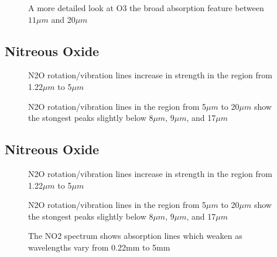 \documentclass[12pt]{article}
\begin{document}
\vspace*{11.5cm}
\begin{figure}[htb]
\caption{A more detailed look at O3 the broad absorption feature between $11 \mu m$ and 20$\mu m$}
\end{figure}
\newpage

\subsection{Nitreous Oxide}


\vspace*{13.5cm}
\begin{figure}[htb]
\caption{N2O rotation/vibration lines increase in strength in the region from
 1.22$\mu m$ to 5$\mu m$}
\end{figure}
\newpage

\vspace*{11.5cm}
\begin{figure}[htb]
\caption{N2O rotation/vibration lines in  the region from
 5$\mu m$ to 20$\mu m$ show the stongest peaks  slightly
below $8 \mu m$, $9\mu m$,  and 17$\mu m$}
\end{figure}
\newpage

\subsection{Nitreous Oxide}


\vspace*{13.5cm}
\begin{figure}[htb]
\caption{N2O rotation/vibration lines increase in strength in the region from
 1.22$\mu m$ to 5$\mu m$}
\end{figure}
\newpage

\vspace*{11.5cm}
\begin{figure}[htb]
\caption{N2O rotation/vibration lines in  the region from
 5$\mu m$ to 20$\mu m$ show the stongest peaks  slightly
below $8 \mu m$, $9\mu m$,  and 17$\mu m$}
\end{figure}
\newpage


\vspace*{11.5cm}
\begin{figure}[htb]
\caption{The NO2 spectrum shows absorption lines which weaken as wavelengths
 vary from 0.22mm to 5mm}
\end{figure}
\newpage
\end{document}
